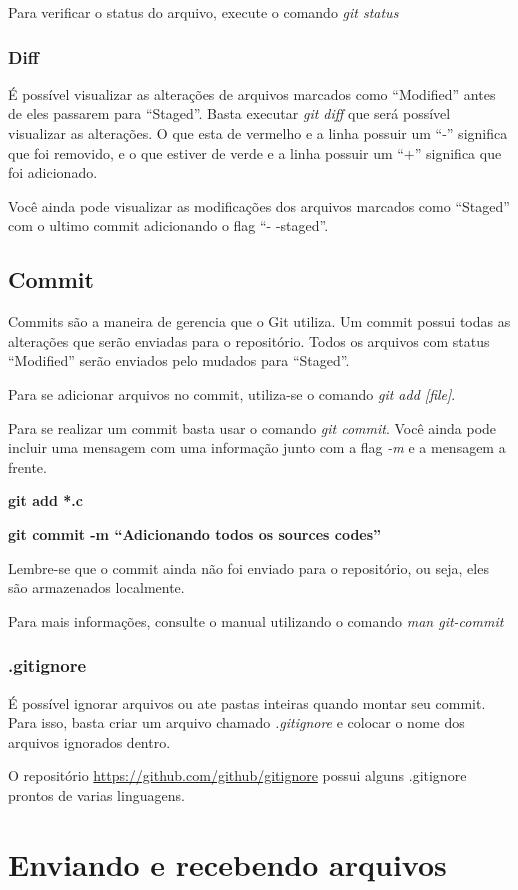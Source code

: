 \documentclass[]{article}
\begin{document}
Para verificar o status do arquivo, execute o comando \textit{git status}
\subsubsection*{Diff}
É possível visualizar as alterações de arquivos marcados como ``Modified'' antes de eles passarem para ``Staged''. 
Basta executar \textit{git diff} que será possível visualizar as alterações.
O que esta de vermelho e a linha possuir um ``-'' significa que foi removido, e o que estiver de verde e a linha possuir um ``+'' significa que foi adicionado.


Você ainda pode visualizar as modificações dos arquivos marcados como ``Staged'' com o ultimo commit adicionando o flag ``- -staged''.

\subsection*{Commit}
Commits são a maneira de gerencia que o Git utiliza. Um commit possui todas as alterações que serão enviadas para o repositório.
Todos os arquivos com status ``Modified'' serão enviados pelo mudados para ``Staged''.

 Para se adicionar arquivos no commit, utiliza-se o comando \textit{git add [file]}.

 Para se realizar um commit basta usar o comando \textit{git commit}. 
 Você ainda pode incluir uma mensagem com uma informação junto com a flag \textit{-m} e a mensagem a frente.

 
 \textbf{git add *.c}


 \textbf{git commit -m ``Adicionando todos os sources codes''}

 Lembre-se que o commit ainda não foi enviado para o repositório, ou seja, eles são armazenados localmente.

 Para mais informações, consulte o manual utilizando o comando \textit{man git-commit}
 \subsubsection*{.gitignore}
 É possível ignorar arquivos ou ate pastas inteiras quando montar seu commit.
 Para isso, basta criar um arquivo chamado \textit{.gitignore} e colocar o nome dos arquivos ignorados dentro.

 O repositório \url{https://github.com/github/gitignore} possui alguns .gitignore prontos de varias linguagens.

 
\section{Enviando e recebendo arquivos}
\end{document}
